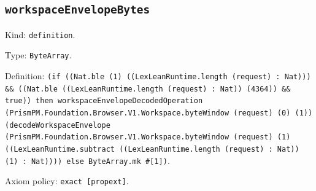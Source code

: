 \documentclass[11pt]{article}
\begin{document}
\subsection*{\texttt{workspaceEnvelopeBytes}}
\noindent Kind: \texttt{definition}.\par
\noindent Type: \texttt{ByteArray}.\par
\noindent Definition: \texttt{(if ((Nat.ble (1) ((LexLeanRuntime.length (request) : Nat))) \&\& ((Nat.ble ((LexLeanRuntime.length (request) : Nat)) (4364)) \&\& true)) then workspaceEnvelopeDecodedOperation (PrismPM.Foundation.Browser.V1.Workspace.byteWindow (request) (0) (1)) (decodeWorkspaceEnvelope (PrismPM.Foundation.Browser.V1.Workspace.byteWindow (request) (1) ((LexLeanRuntime.subtract ((LexLeanRuntime.length (request) : Nat)) (1) : Nat)))) else ByteArray.mk \#[1])}.\par
\noindent Axiom policy: \texttt{exact [propext]}.\par
\end{document}
